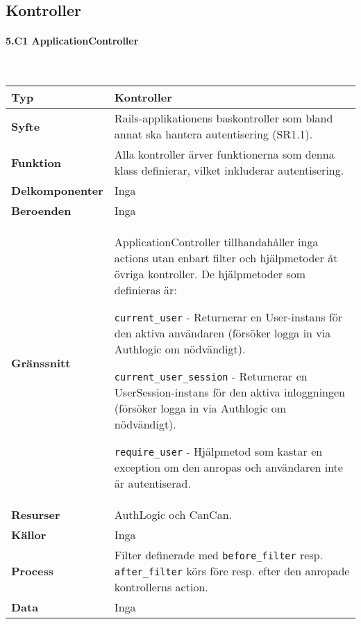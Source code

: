 \documentclass[a4paper, twoside, 11pt, titlepage]{article}
\begin{document}
	\clearpage %
	\subsection{Kontroller}



			\paragraph{5.C1 ApplicationController}\

			\begin {table} [ht] \begin{tabular} {  p{3.5cm} p{11.6cm} }
				\hline
				{\sffamily\textbf{Typ}} & {Kontroller} \\
				\hline
				{\sffamily\textbf{Syfte}} & {Rails-applikationens baskontroller som bland annat ska hantera autentisering (SR1.1).} \\
				\hline
				{\sffamily\textbf{Funktion}} & {Alla kontroller ärver funktionerna som denna klass definierar, vilket inkluderar autentisering.} \\
				\hline
				{\sffamily\textbf{Delkomponenter}} & {Inga} \\
				\hline
				{\sffamily\textbf{Beroenden}} & {Inga} \\
				\hline
				{\sffamily\textbf{Gränssnitt}} & {ApplicationController tillhandahåller inga actions utan enbart filter och hjälpmetoder åt övriga kontroller. De hjälpmetoder som definieras är:

{\tt current\_user} - Returnerar en User-instans för den aktiva användaren (försöker logga in via Authlogic om nödvändigt).

{\tt current\_user\_session} - Returnerar en UserSession-instans för den aktiva inloggningen (försöker logga in via Authlogic om nödvändigt).

{\tt require\_user} - Hjälpmetod som kastar en exception om den anropas och användaren inte är autentiserad.} \\
				\hline
				{\sffamily\textbf{Resurser}} & {AuthLogic och CanCan.} \\
				\hline
				{\sffamily\textbf{Källor}} & {Inga} \\
				\hline
				{\sffamily\textbf{Process}} & {Filter definerade med {\tt before\_filter} resp. {\tt after\_filter} körs före resp. efter den anropade kontrollerns action.} \\
				\hline
				{\sffamily\textbf{Data}} & {Inga} \\
				\hline
			\end{tabular} \end{table} \FloatBarrier
\end{document}
